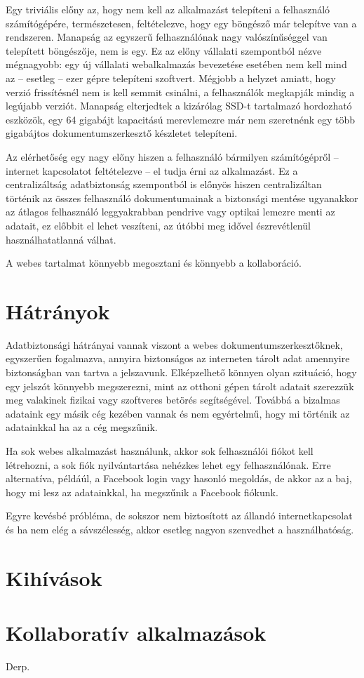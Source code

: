 Egy triviális előny az, hogy nem kell az alkalmazást telepíteni a felhasználó számítógépére, természetesen, feltételezve, hogy egy böngésző már telepítve van a rendszeren. Manapság az egyszerű felhasználónak nagy valószínűséggel van telepített böngészője, nem is egy. Ez az előny vállalati szempontból nézve mégnagyobb: egy új vállalati webalkalmazás bevezetése esetében nem kell mind az -- esetleg -- ezer gépre telepíteni szoftvert.
Mégjobb a helyzet amiatt, hogy verzió frissítésnél nem is kell semmit csinálni, a felhasználók megkapják mindig a legújabb verziót. Manapság elterjedtek a kizárólag SSD-t tartalmazó hordozható eszközök, egy 64 gigabájt kapacitású merevlemezre már nem szeretnénk egy több gigabájtos dokumentumszerkesztő készletet telepíteni.

Az elérhetőség egy nagy előny hiszen a felhasználó bármilyen számítógépről -- internet kapcsolatot feltételezve -- el tudja érni az alkalmazást. Ez a centralizáltság adatbiztonság szempontból is előnyös hiszen centralizáltan történik az összes felhasználó dokumentumainak a biztonsági mentése ugyanakkor az átlagos felhasználó leggyakrabban pendrive vagy optikai lemezre menti az adatait, ez előbbit el lehet veszíteni, az útóbbi meg idővel észrevétlenül használhatatlanná válhat. 

A webes tartalmat könnyebb megosztani és könnyebb a kollaboráció.

\section{Hátrányok}

Adatbiztonsági hátrányai vannak viszont a webes dokumentumszerkesztőknek, egyszerűen fogalmazva, annyira biztonságos az interneten tárolt adat amennyire biztonságban van tartva a jelszavunk. Elképzelhető könnyen olyan szituáció, hogy egy jelszót könnyebb megszerezni, mint az otthoni gépen tárolt adatait szerezzük meg valakinek fizikai vagy szoftveres betörés segítségével. Továbbá a bizalmas adataink egy másik cég kezében vannak és nem egyértelmű, hogy mi történik az adatainkkal ha az a cég megszűnik.

Ha sok webes alkalmazást használunk, akkor sok felhasználói fiókot kell létrehozni, a sok fiók nyilvántartása nehézkes lehet egy felhasználónak. Erre alternatíva, példáúl, a Facebook login vagy hasonló megoldás, de akkor az a baj, hogy mi lesz az adatainkkal, ha megszűnik a Facebook fiókunk. 

Egyre kevésbé próbléma, de sokszor nem biztosított az állandó internetkapcsolat és ha nem elég a sávszélesség, akkor esetleg nagyon szenvedhet a használhatóság.



\section{Kihívások}



\section{Kollaboratív alkalmazások}
Derp.



